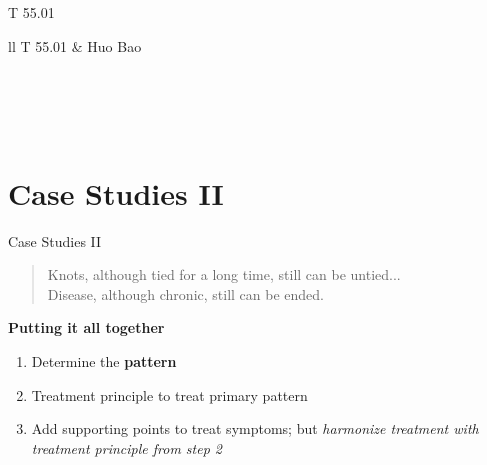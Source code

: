 \begin{frame}{T 55.01}
\begin{table}[]
\begin{tabular}{ll}
T 55.01                                                                  & Huo Bao                                                                  \\ \hline
{}                                                                                                         \\
 \\ \hline
{}                                                                                                      \\
                                                                             \\ \hline
\end{tabular}
\end{table}
\end{frame}

\section{Case Studies II}

\begin{frame}{Case Studies II}

\begin{quote}
Knots, although tied for a long time, still can be untied... \\
Disease, although chronic, still can be ended.
\end{quote}

\textbf{\large Putting it all together}

\begin{enumerate}
\item Determine the \textbf{pattern}
\item Treatment principle to treat primary pattern
\item Add supporting points to treat symptoms; but \textit{harmonize treatment with treatment principle from step 2}
\end{enumerate}

\end{frame}

